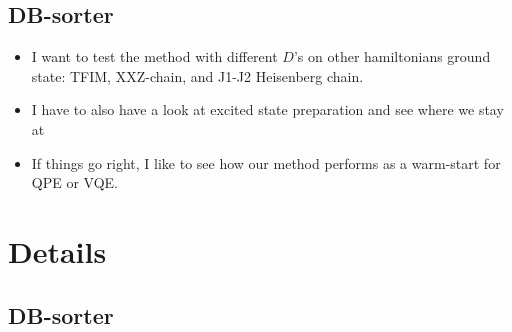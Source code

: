 \documentclass[11pt]{article}
\begin{document}
\subsection{DB-sorter}
\begin{itemize}
    \item I want to test the method with different $D$'s on other hamiltonians ground state: TFIM, XXZ-chain, and J1-J2 Heisenberg chain.
    \item I have to also have a look at excited state preparation and see where we stay at
    \item If things go right, I like to see how our method performs as a warm-start for QPE or VQE.
\end{itemize}


\section{Details}
\subsection{DB-sorter}
\end{document}
